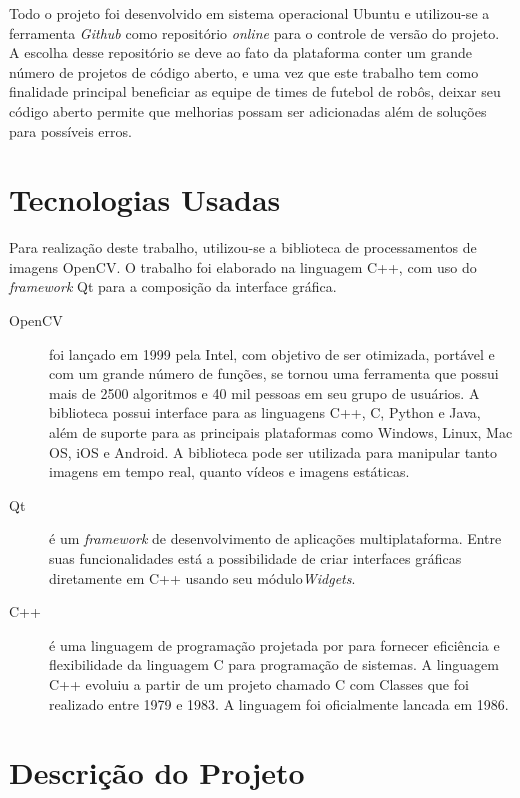 	Todo o projeto foi desenvolvido em sistema operacional Ubuntu e utilizou-se a ferramenta {\it Github} como repositório {\it online} para o controle de versão do projeto. A escolha desse repositório se deve ao fato da plataforma conter um grande número de projetos de código aberto, e uma vez que este trabalho tem como finalidade principal beneficiar as equipe de times de futebol de robôs, deixar seu código aberto permite que melhorias possam ser adicionadas além de soluções para possíveis erros.
			
\section{Tecnologias Usadas}
Para realização deste trabalho,  utilizou-se a biblioteca de processamentos de imagens OpenCV. O trabalho foi elaborado na linguagem C++, com uso do {\it framework} Qt para a composição da interface gráfica.
 
\begin{description}
	\item[OpenCV] foi lançado em 1999 pela Intel\cite{Culjak:2012}, com objetivo de ser otimizada, portável e com um grande número de funções, se tornou uma ferramenta que possui mais de 2500 algoritmos e 40 mil pessoas em seu grupo de usuários\cite{Culjak:2012}. A biblioteca possui interface para as linguagens C++, C, Python e Java, além de suporte para as principais plataformas como Windows, Linux, Mac OS, iOS e Android. A biblioteca pode ser utilizada para manipular tanto imagens em tempo real, quanto vídeos e imagens estáticas.
	
	\item[Qt] é um {\it framework} de desenvolvimento de aplicações multiplataforma. Entre suas funcionalidades está a possibilidade de criar interfaces gráficas diretamente em C++ usando seu módulo{\it  Widgets}.
	
	\item [C++] é uma linguagem de programação projetada por  para fornecer eficiência e flexibilidade da linguagem C para programação de sistemas. A linguagem C++ evoluiu a partir de um projeto chamado C com Classes que foi realizado  entre 1979 e 1983. A linguagem foi oficialmente lancada em 1986.
\end{description}

\section{Descrição do Projeto}
